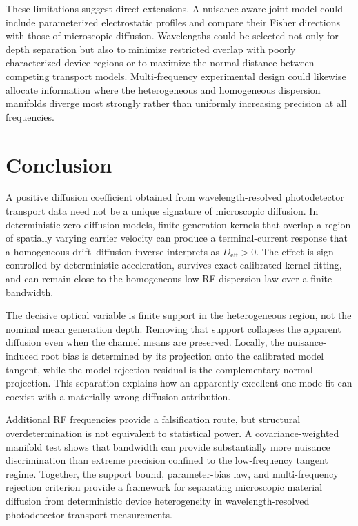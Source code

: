 \documentclass[aps,pra,twocolumn,superscriptaddress,nofootinbib]{revtex4-2}
\newcommand{\Deff}{D_{\mathrm{eff}}}
\begin{document}
These limitations suggest direct extensions. A nuisance-aware joint model could include parameterized electrostatic profiles and compare their Fisher directions with those of microscopic diffusion. Wavelengths could be selected not only for depth separation but also to minimize restricted overlap with poorly characterized device regions or to maximize the normal distance between competing transport models. Multi-frequency experimental design could likewise allocate information where the heterogeneous and homogeneous dispersion manifolds diverge most strongly rather than uniformly increasing precision at all frequencies.

\section{Conclusion}

A positive diffusion coefficient obtained from wavelength-resolved photodetector transport data need not be a unique signature of microscopic diffusion. In deterministic zero-diffusion models, finite generation kernels that overlap a region of spatially varying carrier velocity can produce a terminal-current response that a homogeneous drift--diffusion inverse interprets as $\Deff>0$. The effect is sign controlled by deterministic acceleration, survives exact calibrated-kernel fitting, and can remain close to the homogeneous low-RF dispersion law over a finite bandwidth.

The decisive optical variable is finite support in the heterogeneous region, not the nominal mean generation depth. Removing that support collapses the apparent diffusion even when the channel means are preserved. Locally, the nuisance-induced root bias is determined by its projection onto the calibrated model tangent, while the model-rejection residual is the complementary normal projection. This separation explains how an apparently excellent one-mode fit can coexist with a materially wrong diffusion attribution.

Additional RF frequencies provide a falsification route, but structural overdetermination is not equivalent to statistical power. A covariance-weighted manifold test shows that bandwidth can provide substantially more nuisance discrimination than extreme precision confined to the low-frequency tangent regime. Together, the support bound, parameter-bias law, and multi-frequency rejection criterion provide a framework for separating microscopic material diffusion from deterministic device heterogeneity in wavelength-resolved photodetector transport measurements.



\end{document}
